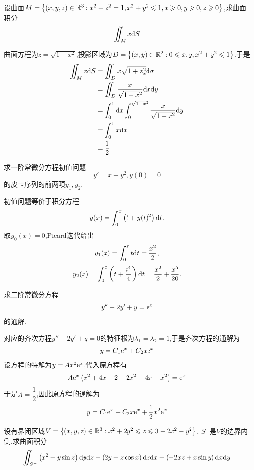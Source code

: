 \documentclass{ctexart}
\begin{document}
\begin{problem}[4.(10\songti{分})]
    设曲面$M=\left\{(x,y,z)\in\mathbb{R}^3:x^2+z^2=1,x^2+y^2\leqslant1,x\geqslant0,y\geqslant0,z\geqslant0\right\}$,求曲面积分
        \[\iint_{M}x\mathrm{d} S\]
        
\end{problem}
\begin{solution}
    曲面方程为$z=\sqrt{1-x^2}$,投影区域为$D=\left\{(x,y)\in\mathbb{R}^2:0\leqslant x,y,x^2+y^2\leqslant 1\right\}$.于是
    \[\begin{aligned}
        \iint_{M}x\mathrm{d} S
        &= \iint_{D}x\sqrt{1+z_x^2}\mathrm{d}\sigma \\
        &= \iint_{D}\dfrac{x}{\sqrt{1-x^2}}\mathrm{d} x\mathrm{d} y \\
        &= \int_0^1\mathrm{d} x\int_0^{\sqrt{1-x^2}}\dfrac{x}{\sqrt{1-x^2}}\mathrm{d} y \\
        &= \int_0^1x\mathrm{d} x \\
        &= \dfrac12
    \end{aligned}\]

\end{solution}
\begin{problem}[5.(10\songti{分})]
    求一阶常微分方程初值问题
        \[y'=x+y^2,y(0)=0\]
        的皮卡序列的前两项$y_1,y_2$.
\end{problem}
\begin{solution}
初值问题等价于积分方程
    \[y(x)=\int_0^x\left(t+y(t)^2\right)\mathrm{d} t.\]
    取$y_0(x)=0$,Picard迭代给出
    \[y_1(x)=\int_0^xt\mathrm{d} t=\dfrac{x^2}{2},\]
    \[y_2(x)=\int_0^x\left(t+\dfrac{t^4}{4}\right)\mathrm{d} t
        =\dfrac{x^2}{2}+\dfrac{x^5}{20}.\]
\end{solution}
\begin{problem}[6.(10\songti{分})]
    求二阶常微分方程
        \[y''-2y'+y=\mathrm{e}^x\]
        的通解.
\end{problem}
\begin{solution}
    对应的齐次方程$y''-2y'+y=0$的特征根为$\lambda_1=\lambda_2=1$,于是齐次方程的通解为
    \[y=C_1\mathrm{e}^x+C_2x\mathrm{e}^x\]
    设方程的特解为$y=Ax^2\mathrm{e}^x$,代入原方程有
    \[A\mathrm{e}^x\left(x^2+4x+2-2x^2-4x+x^2\right)=\mathrm{e}^x\]
    于是$A=\dfrac12$,因此原方程的通解为
    \[y=C_1\mathrm{e}^x+C_2x\mathrm{e}^x+\dfrac12x^2\mathrm{e}^x\]

\end{solution}
\begin{problem}[7.(10\songti{分})]
    设有界闭区域$V=\left\{(x,y,z)\in\mathbb{R}^3:x^2+2y^2\leqslant z\leqslant 3-2x^2-y^2\right\}$,%
        $S^-$是$V$的边界内侧,求曲面积分
        \[\iint_{S^-}\left(x^2+y\sin z\right)\mathrm{d} y\mathrm{d} z-\left(2y+z\cos x\right)\mathrm{d} z\mathrm{d} x+\left(-2xz+x\sin y\right)\mathrm{d} x\mathrm{d} y\]

\end{problem}
\end{document}

